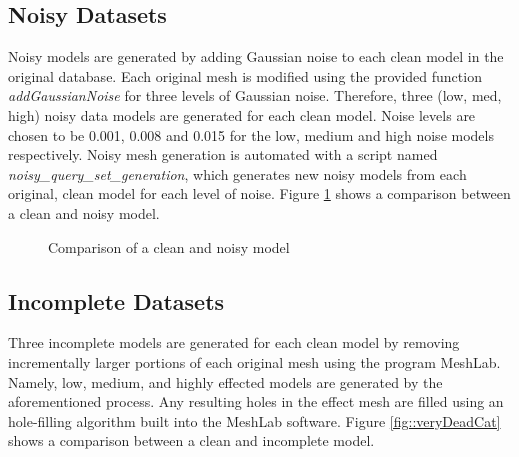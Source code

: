 \documentclass[12pt]{article}
\begin{document}
	\subsection*{Noisy Datasets}

		\noindent
		Noisy models are generated by adding Gaussian noise to each clean model in the original database. Each original mesh is modified using the provided function \emph{addGaussianNoise} for three levels of Gaussian noise. Therefore, three (low, med, high) noisy data models are generated for each clean model. Noise levels are chosen to be 0.001, 0.008 and 0.015 for the low, medium and high noise models respectively. Noisy mesh generation is automated with a script named \emph{noisy\_query\_set\_generation}, which generates new noisy models from each original, clean model for each level of noise. Figure \ref{fig::veryNoisyCat} shows a comparison between a clean and noisy model.

	\begin{figure}[!h]
		\centering
		\caption{Comparison of a clean and noisy model}
		\label{fig::veryNoisyCat}
	\end{figure}


	\subsection*{Incomplete Datasets}

		\noindent
		Three incomplete models are generated for each clean model by removing incrementally larger portions of each original mesh using the program MeshLab. Namely, low, medium, and highly effected models are generated by the aforementioned process. Any resulting holes in the effect mesh are filled using an hole-filling algorithm built into the MeshLab software. Figure \ref{fig::veryDeadCat} shows a comparison between a clean and incomplete model.
 
\end{document}
